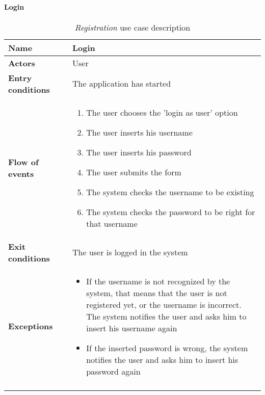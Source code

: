 		\paragraph{Login}
		\begin{longtable}{p{0.25\linewidth}p{0.75\linewidth}}
			\toprule
			\textbf{Name} & \textbf{Login} \\
			\midrule
			\textbf{Actors} & User \\
			\midrule
			\textbf{Entry conditions} & The application has started \\
			\midrule
			\textbf{Flow of events} & 
			\begin{enumerate}
				\item The user chooses the 'login as user' option
				\item The user inserts his username
				\item The user inserts his password
				\item The user submits the form
				\item The system checks the username to be existing
				\item The system checks the password to be right for that username
			\end{enumerate} \\
			\midrule
			\textbf{Exit conditions} & The user is logged in the system\\
			\midrule
			\textbf{Exceptions} & 
			\begin{itemize}
				\item If the username is not recognized by the system, that means that the user is not registered yet, or the username is incorrect. The system notifies the user and asks him to insert his username again
				\item If the inserted password is wrong, the system notifies the user and asks him to insert his password again			
			\end{itemize} \\
			\bottomrule
			\caption{\emph{Registration} use case description}
		\end{longtable}
	

